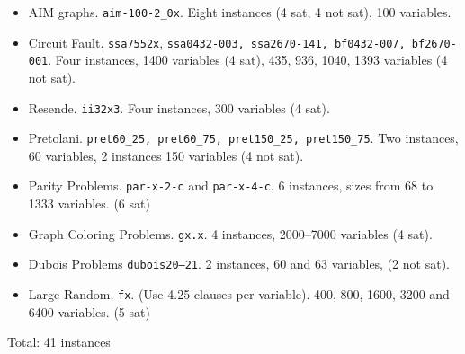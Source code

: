 \begin{itemize}
\item AIM graphs. {\tt aim-100-2\_0x}.  Eight instances (4 sat, 4 not
  sat), 100 variables.

\item Circuit Fault. {\tt ssa7552x}, {\tt ssa0432-003, ssa2670-141,
    bf0432-007, bf2670-001}. Four instances, 1400 variables (4
  sat), 435, 936, 1040, 1393 variables  (4 not sat).

\item Resende. {\tt ii32x3}.  Four instances, 300 variables (4 sat).

\item Pretolani. {\tt pret60\_25, pret60\_75, pret150\_25,
    pret150\_75}. Two instances, 60 variables, 2 instances 150
  variables (4 not sat).

\item Parity Problems. {\tt par-x-2-c} and {\tt par-x-4-c}.  6
  instances, sizes from 68 to 1333 variables. (6 sat)

\item Graph Coloring Problems. {\tt gx.x}. 4 instances, 2000--7000
  variables (4 sat).

\item Dubois Problems {\tt dubois20--21}. 2 instances, 60 and 63 
  variables, (2 not sat).

\item Large Random.  {\tt fx}. (Use 4.25 clauses per variable).  400,
  800, 1600, 3200 and 6400 variables. (5 sat)

\end{itemize}

Total: 41 instances



